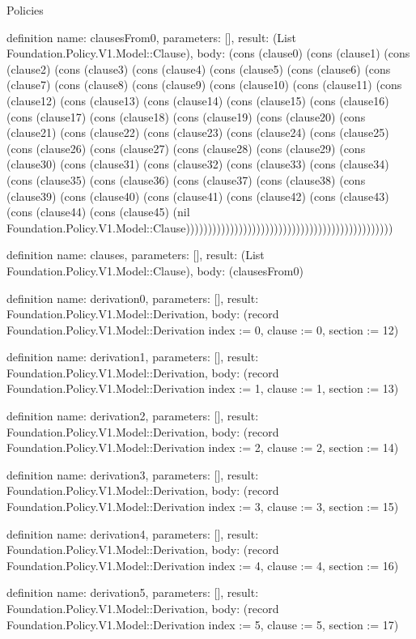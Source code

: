 \begin{lexlean}{Policies}
\begin{semanticmodule}
definition{
  name: clausesFrom0,
  parameters: [],
  result: (List Foundation.Policy.V1.Model::Clause),
  body: (cons (clause0) (cons (clause1) (cons (clause2) (cons (clause3) (cons (clause4) (cons (clause5) (cons (clause6) (cons (clause7) (cons (clause8) (cons (clause9) (cons (clause10) (cons (clause11) (cons (clause12) (cons (clause13) (cons (clause14) (cons (clause15) (cons (clause16) (cons (clause17) (cons (clause18) (cons (clause19) (cons (clause20) (cons (clause21) (cons (clause22) (cons (clause23) (cons (clause24) (cons (clause25) (cons (clause26) (cons (clause27) (cons (clause28) (cons (clause29) (cons (clause30) (cons (clause31) (cons (clause32) (cons (clause33) (cons (clause34) (cons (clause35) (cons (clause36) (cons (clause37) (cons (clause38) (cons (clause39) (cons (clause40) (cons (clause41) (cons (clause42) (cons (clause43) (cons (clause44) (cons (clause45) (nil Foundation.Policy.V1.Model::Clause)))))))))))))))))))))))))))))))))))))))))))))))
}

definition{
  name: clauses,
  parameters: [],
  result: (List Foundation.Policy.V1.Model::Clause),
  body: (clausesFrom0)
}

definition{
  name: derivation0,
  parameters: [],
  result: Foundation.Policy.V1.Model::Derivation,
  body: (record Foundation.Policy.V1.Model::Derivation {index := 0, clause := 0, section := 12})
}

definition{
  name: derivation1,
  parameters: [],
  result: Foundation.Policy.V1.Model::Derivation,
  body: (record Foundation.Policy.V1.Model::Derivation {index := 1, clause := 1, section := 13})
}

definition{
  name: derivation2,
  parameters: [],
  result: Foundation.Policy.V1.Model::Derivation,
  body: (record Foundation.Policy.V1.Model::Derivation {index := 2, clause := 2, section := 14})
}

definition{
  name: derivation3,
  parameters: [],
  result: Foundation.Policy.V1.Model::Derivation,
  body: (record Foundation.Policy.V1.Model::Derivation {index := 3, clause := 3, section := 15})
}

definition{
  name: derivation4,
  parameters: [],
  result: Foundation.Policy.V1.Model::Derivation,
  body: (record Foundation.Policy.V1.Model::Derivation {index := 4, clause := 4, section := 16})
}

definition{
  name: derivation5,
  parameters: [],
  result: Foundation.Policy.V1.Model::Derivation,
  body: (record Foundation.Policy.V1.Model::Derivation {index := 5, clause := 5, section := 17})
}


\end{semanticmodule}
\end{lexlean}
